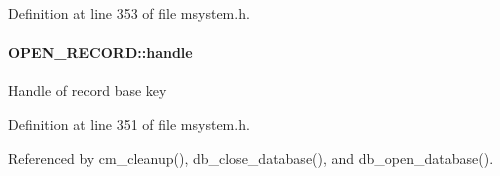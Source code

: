 Definition at line 353 of file msystem.h.
\paragraph[{handle}]{ {\bf OPEN\_\-RECORD::handle}}\hfill\label{structOPEN__RECORD_a9f30758afbcd2516daef6d08369fc12b}
Handle of record base key 

Definition at line 351 of file msystem.h.

Referenced by cm\_\-cleanup(), db\_\-close\_\-database(), and db\_\-open\_\-database().
